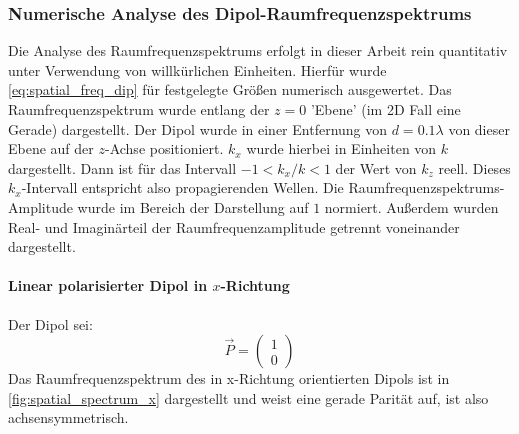 \documentclass[a4paper, titlepage,  ngerman, fullpage]{book}
\begin{document}
	\subsubsection{Numerische Analyse des Dipol-Raumfrequenzspektrums}
	Die Analyse des Raumfrequenzspektrums erfolgt in dieser Arbeit rein quantitativ unter Verwendung von willkürlichen Einheiten. Hierfür wurde \eqref{eq:spatial_freq_dip} für festgelegte Größen numerisch ausgewertet.
	Das Raumfrequenzspektrum wurde entlang der $z = 0$ 'Ebene' (im 2D Fall eine Gerade) dargestellt. Der Dipol wurde in einer Entfernung von $d = 0.1 \lambda$  von dieser Ebene auf der $z$-Achse positioniert. $k_x$ wurde hierbei in Einheiten von $k$ dargestellt. Dann ist für das Intervall $-1 < k_x / k <1$ der Wert von $k_z$ reell. Dieses $k_x$-Intervall entspricht also propagierenden Wellen. Die Raumfrequenzspektrums-Amplitude wurde im Bereich der Darstellung auf $1$ normiert. Außerdem wurden Real- und Imaginärteil der Raumfrequenzamplitude getrennt voneinander dargestellt.
	\paragraph{Linear polarisierter Dipol in $x$-Richtung}
	Der Dipol sei:
	$$\vec{P} = \begin{pmatrix} 1 \\ 0\end{pmatrix}$$
	Das Raumfrequenzspektrum des in x-Richtung orientierten Dipols ist in \ref{fig:spatial_spectrum_x} dargestellt und weist eine gerade Parität auf, ist also achsensymmetrisch.	
\end{document}
